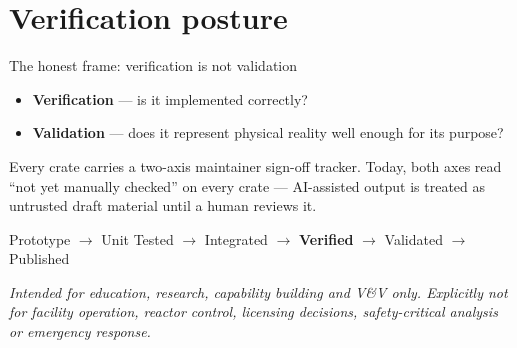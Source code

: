 \documentclass[aspectratio=169,11pt]{beamer}
\newcommand{\caveat}[1]{{\footnotesize\color{opmuted}\textit{#1}}}
\begin{document}
\section{Verification posture}

\begin{frame}{The honest frame: verification is not validation}
  \begin{itemize}
    \item \textbf{Verification} --- is it implemented correctly?
    \item \textbf{Validation} --- does it represent physical reality well enough for its purpose?
  \end{itemize}
  \vspace{0.8em}
  Every crate carries a two-axis maintainer sign-off tracker. \alert{Today, both
  axes read ``not yet manually checked'' on every crate} --- AI-assisted output is
  treated as untrusted draft material until a human reviews it.
  \vspace{0.8em}
  \begin{center}
  \small
  Prototype $\rightarrow$ Unit Tested $\rightarrow$ Integrated $\rightarrow$
  \textbf{Verified} $\rightarrow$ Validated $\rightarrow$ Published
  \end{center}
  \vspace{0.8em}
  \caveat{Intended for education, research, capability building and V\&V only.
  Explicitly not for facility operation, reactor control, licensing decisions,
  safety-critical analysis or emergency response.}
\end{frame}
\end{document}

